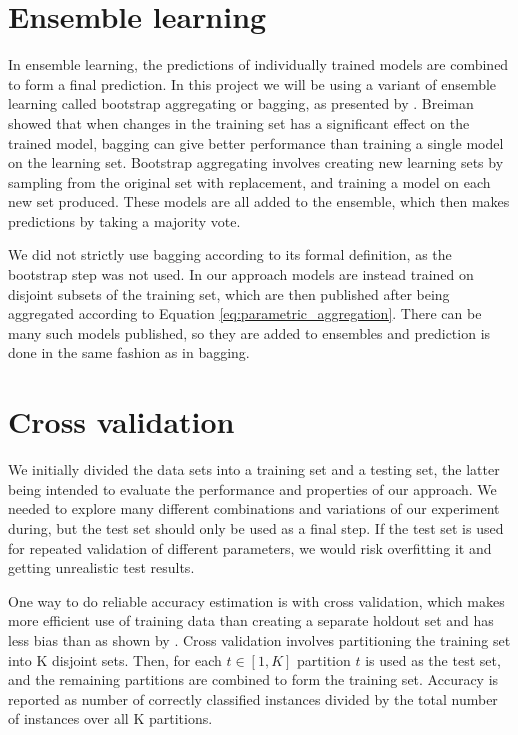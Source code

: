 \section{Ensemble learning}

In ensemble learning, the predictions of individually trained models are combined to form a final prediction\citep{opitz1999popularensemble}. In this project we will be using a variant of ensemble learning called bootstrap aggregating or bagging, as presented by \cite{breiman1996bagging}. Breiman showed that when changes in the training set has a significant effect on the trained model, bagging can give better performance than training a single model on the learning set. Bootstrap aggregating involves creating new learning sets by sampling from the original set with replacement, and training a model on each new set produced. These models are all added to the ensemble, which then makes predictions by taking a majority vote.

We did not strictly use bagging according to its formal definition, as the bootstrap step was not used. In our approach models are instead trained on disjoint subsets of the training set, which are then published after being aggregated according to Equation \ref{eq:parametric_aggregation}. There can be many such models published, so they are added to ensembles and prediction is done in the same fashion as in bagging. 

\section{Cross validation}

We initially divided the data sets into a training set and a testing set, the latter being intended to evaluate the performance and properties of our approach. We needed to explore many different combinations and variations of our experiment during, but the test set should only be used as a final step. If the test set is used for repeated validation of different parameters, we would risk overfitting it and getting unrealistic test results. 

One way to do reliable accuracy estimation is with cross validation, which makes more efficient use of training data than creating a separate holdout set and has less bias than as shown by \cite{kohavi1995crossvalidation}. Cross validation involves partitioning the training set into K disjoint sets. Then, for each $t \in [1, K]$ partition $t$ is used as the test set, and the remaining partitions are combined to form the training set. Accuracy is reported as number of correctly classified instances divided by the total number of instances over all K partitions. 

